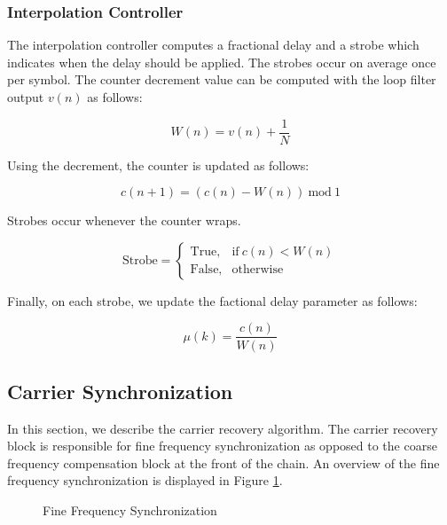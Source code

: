 \documentclass[conference,onecolumn]{IEEEtran}
\begin{document}
\subsubsection{Interpolation Controller}

The interpolation controller computes a fractional delay and a strobe which indicates when the delay should be applied. The strobes occur on average once per symbol. The counter decrement value can be computed with the loop filter output $v(n)$ as follows:

\begin{equation}
	W(n) = v(n) + \frac{1}{N}
\end{equation}

\noindent Using the decrement, the counter is updated as follows:

\begin{equation}
	c(n + 1) = (c(n) - W(n))\ \text{mod}\ 1
\end{equation}

\noindent Strobes occur whenever the counter wraps.

\begin{equation}
	\text{Strobe} = \begin{cases}
		\text{True}, & \text{if}\ c(n) < W(n)\\
		\text{False}, & \text{otherwise}
	\end{cases}
\end{equation}

\noindent Finally, on each strobe, we update the factional delay parameter as follows:

\begin{equation}
	\mu(k) = \frac{c(n)}{W(n)}
\end{equation}

\subsection{Carrier Synchronization}

In this section, we describe the carrier recovery algorithm. The carrier recovery block is responsible for fine frequency synchronization as opposed to the coarse frequency compensation block at the front of the chain. An overview of the fine frequency synchronization is displayed in Figure \ref{fig::carrier_synchronization}.

\begin{figure}[H]
	\centerline{}
	\caption{Fine Frequency Synchronization}
	\label{fig::carrier_synchronization}
\end{figure}
\end{document}
